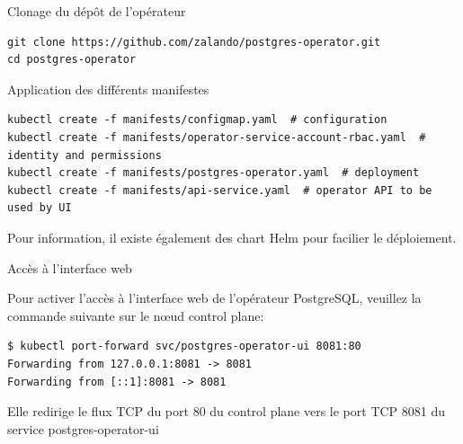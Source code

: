 \begin{frame}[fragile]{Clonage du dépôt de l'opérateur}
   
\begin{tiny}
\begin{Verbatim}[commandchars=\&\#\#]
git clone https://github.com/zalando/postgres-operator.git
cd postgres-operator
\end{Verbatim}
\end{tiny}

\end{frame}


\begin{frame}[fragile]{Application des différents manifestes}
   
\begin{tiny}
\begin{Verbatim}[commandchars=\&\{\}]
kubectl create -f manifests/configmap.yaml  # configuration
kubectl create -f manifests/operator-service-account-rbac.yaml  # identity and permissions
kubectl create -f manifests/postgres-operator.yaml  # deployment
kubectl create -f manifests/api-service.yaml  # operator API to be used by UI
\end{Verbatim}
\end{tiny}

   Pour information, il existe également des chart Helm pour facilier le déploiement.

\end{frame}


\begin{frame}[fragile]{Accès à l'interface web}
   
   Pour activer l'accès à l'interface web de l'opérateur PostgreSQL, veuillez la commande suivante sur le n\oe{}ud control plane:
\begin{tiny}
\begin{Verbatim}[commandchars=\&\{\}]
$ kubectl port-forward svc/postgres-operator-ui 8081:80
Forwarding from 127.0.0.1:8081 -> 8081
Forwarding from [::1]:8081 -> 8081

\end{Verbatim}
\end{tiny}

   Elle redirige le flux TCP du port 80 du control plane vers le port TCP 8081 du service postgres-operator-ui

\end{frame}

